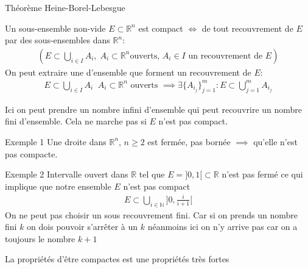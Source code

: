 \begin{parag}{Théorème Heine-Borel-Lebesgue}
    \begin{theoreme}
        Un sous-ensemble non-vide $E \subset \mathbb{R}^n $ est compact $ \iff$ de tout recouvrement de $E$ par des sous-ensembles dans $ \mathbb{R}^n $:
        \begin{align*}
            ( E \subset \bigcup_{i \in I} A_i, \; A_i \subset \mathbb{R}^n  \text{ouverts, } A_i \in I \text{ un recouvrement de } E )
        \end{align*}
        On peut extraire une  d'ensemble que forment un recouvrement de $E$:
        \begin{align*}
            E \subset \bigcup_{i \in I} A_i \; \; A_i \subset \mathbb{R}^n  \text{ ouverts } \implies \exists \{ A_{i_j}\}_{j=1}^m: E \subset \bigcup_{j = 1}^m A_{i_j}
        \end{align*}
    \end{theoreme}
   Ici on peut prendre un nombre infini d'ensemble qui peut recouvrire un nombre fini d'ensemble. Cela ne marche pas si $E$ n'est pas compact.
\begin{subparag}{Exemple 1}
    Une droite dans $ \mathbb{R}^n $, $ n \geq 2$ est fermée, pas bornée $ \implies$ qu'elle n'est pas compacte.
\end{subparag}
\begin{subparag}{Exemple 2}
    Intervalle ouvert dans $  \mathbb{R}$ tel que $E = ] 0, 1 [ \subset \mathbb{R}$ n'est pas fermé ce qui implique que notre ensemble $E$ n'est pas compact
    \begin{align*}
        E \subset \bigcup_{i \in \mathbb{N}} ]0, \frac{i}{i + 1}[
    \end{align*}
    On ne peut pas choisir un sous recouvrement fini. Car si on prends un nombre fini $k$ on dois pouvoir s'arrêter à un $k$ néanmoins ici on n'y arrive pas car on a toujours le nombre $k + 1$
    \begin{framedremark}
        La propriétés d'être compactes est une propriétés très fortes
    \end{framedremark}
\end{subparag}
\end{parag}

